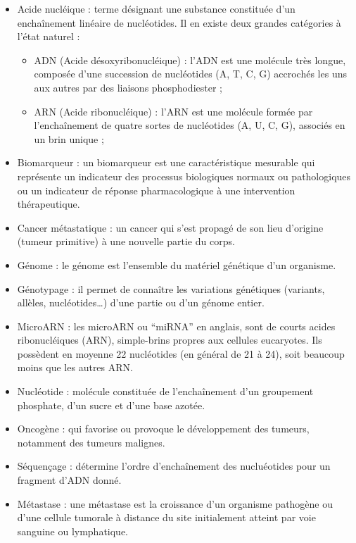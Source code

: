 \documentclass[12pt, openany]{report}
\begin{document}
\begin{itemize}

\item Acide nucléique : terme désignant une substance constituée d’un enchaînement linéaire de nucléotides. Il en existe deux grandes catégories à l’état naturel : 
\begin{itemize}
\item ADN (Acide désoxyribonucléique) : l’ADN est une molécule très longue, composée d’une succession de nucléotides (A, T, C, G) accrochés les uns aux autres par des liaisons phosphodiester ;
\item ARN (Acide ribonucléique) : l’ARN est une molécule formée par l'enchaînement de quatre sortes de nucléotides (A, U, C, G), associés en un brin unique ;
\end{itemize}

\item Biomarqueur : un biomarqueur est une caractéristique mesurable qui représente un indicateur des processus biologiques normaux ou pathologiques ou un indicateur de réponse pharmacologique à une intervention thérapeutique.

\item Cancer métastatique : un cancer qui s'est propagé de son lieu d'origine (tumeur primitive) à une nouvelle partie du corps.

\item Génome : le génome est l’ensemble du matériel génétique d’un organisme.

\item Génotypage : il permet de connaître les variations génétiques (variants, allèles, nucléotides\ldots) d’une partie ou d’un génome entier.

\item MicroARN : les microARN ou “miRNA” en anglais, sont de courts acides ribonucléiques (ARN), simple-brins propres aux cellules eucaryotes. Ils possèdent en moyenne 22 nucléotides (en général de 21 à 24), soit beaucoup moins que les autres ARN.

\item Nucléotide : molécule constituée de l'enchaînement d’un groupement phosphate, d’un sucre et d’une base azotée.

\item Oncogène : qui favorise ou provoque le développement des tumeurs, notamment des tumeurs malignes.

\item Séquençage : détermine l’ordre d’enchaînement des nucluéotides pour un fragment d’ADN donné.

\item Métastase : une métastase est la croissance d'un organisme pathogène ou d'une cellule tumorale à distance du site initialement atteint par voie sanguine ou lymphatique.

\end{itemize}

\nocite{Andre2014, BA2015}



\end{document}
